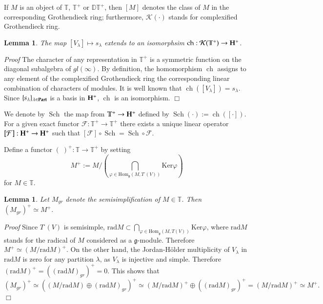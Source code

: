 \documentclass[11pt]{amsart}
\newcounter{theorem}
\newtheorem{lemma}[theo]{Lemma}
\renewenvironment{proof}{ \emph{Proof}}{$\Box$}
\renewcommand{\gg}{\mathfrak{g}}
\renewcommand {\phi} {\varphi}
\newcommand{\Ker}{\mathrm{Ker}}
\newcommand{\rad}{\mathrm{rad}}
\newcommand{\Hom}{\mathrm{Hom}}
\newcommand{\field}[1]{\mathbb{#1}}
\begin{document}
If $M$ is an object of $\mathbb T$, $\mathbb T^+$ or $\mathbb {DT}^+$, then $[M]$ denotes the class of $M$ in the corresponding Grothendieck ring;
furthermore, $\mathcal K({\cdot})$ stands for complexified Grothendieck ring.
\begin{lemma}\label{grfock} The map $[V_\lambda]\mapsto s_\lambda$ extends to an isomorphsim $\operatorname{ch}:\mathcal K(\mathbb T^+)\to \bold{H}^+$.
\end{lemma} 
\begin{proof} The character of any representation in $\mathbb T^+$ is a symmetric function on the diagonal subalgebra
of $gl(\infty)$. By definition, the homomorphism $\operatorname{ch}$ assigns to any element of the complexified Grothendieck ring 
the corresponding linear combination of characters of modules. It is well known that $\operatorname{ch}([V_\lambda])=s_\lambda$.
Since $\{s_\lambda\}_{\lambda\in\bold{Part}}$ is a basis in $\bold{H}^+$, $\operatorname{ch}$ is an isomorphism.
\end{proof}

We denote by $\operatorname{Sch}$ the map from $\mathbb T^+\to \bold{H}^+$ defined by $\operatorname{Sch}(\cdot):=\operatorname{ch}([\cdot])$.
For a given exact functor $\mathcal F:\mathbb T^+\to\mathbb T^+$ there
exists a unique linear operator $[\mathcal F]:\bold{H}^+\to\bold{H}^+$
such that $[\mathcal F]\circ\operatorname{Sch}=\operatorname{Sch}\circ \mathcal F$.



Define a functor $(\;)^+:\field{T}\rightarrow\field{T}^+$ by setting
$$M^+:=M/(\bigcap_{\phi\in\Hom_\gg(M,T^\cdot(V))}\Ker\phi)$$ for
$M\in\mathbb T$.

\begin{lemma}\label{lemma1}
Let $M_{gr}$ denote the semisimplification of $M\in\field{T}$. Then $(M_{gr})^+\simeq M^+$.
\end{lemma}

\begin{proof}
Since $T^\cdot(V)$ is semisimple, $\rad M\subset\bigcap_{\phi\in\Hom_\gg(M,T(V))}\Ker\phi$, 
where $\rad M$ stands for the radical of $M$ considered as a $\gg$-module.
Therefore $M^+\simeq(M/\rad M)^+$. On the other hand, the Jordan-H\"{o}lder multiplicity
of $V_\lambda$ in $\rad M$ is zero for any partition $\lambda$, as $V_\lambda$ is injective
and simple. Therefore $(\rad M)^+=((\rad M)_{gr})^+=0$. This shows that 
$$(M_{gr})^+\simeq((M/\rad M)\oplus(\rad M)_{gr})^+\simeq(M/\rad M)^+\oplus((\rad M)_{gr})^+ = (M/\rad M)^+\simeq M^+.$$
\end{proof}
\end{document}

